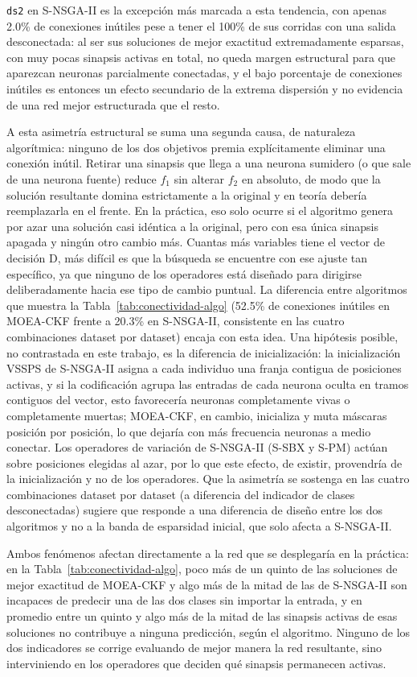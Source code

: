 \texttt{ds2} en S-NSGA-II es la excepción más marcada a esta tendencia, con apenas 2.0\% de conexiones inútiles pese a tener el 100\% de sus corridas con una salida desconectada: al ser sus soluciones de mejor exactitud extremadamente esparsas, con muy pocas sinapsis activas en total, no queda margen estructural para que aparezcan neuronas parcialmente conectadas, y el bajo porcentaje de conexiones inútiles es entonces un efecto secundario de la extrema dispersión y no evidencia de una red mejor estructurada que el resto.

A esta asimetría estructural se suma una segunda causa, de naturaleza algorítmica: ninguno de los dos objetivos premia explícitamente eliminar una conexión inútil. Retirar una sinapsis que llega a una neurona sumidero (o que sale de una neurona fuente) reduce $f_1$ sin alterar $f_2$ en absoluto, de modo que la solución resultante domina estrictamente a la original y en teoría debería reemplazarla en el frente. En la práctica, eso solo ocurre si el algoritmo genera por azar una solución casi idéntica a la original, pero con esa única sinapsis apagada y ningún otro cambio más. Cuantas más variables tiene el vector de decisión D, más difícil es que la búsqueda se encuentre con ese ajuste tan específico, ya que ninguno de los operadores está diseñado para dirigirse deliberadamente hacia ese tipo de cambio puntual. La diferencia entre algoritmos que muestra la Tabla~\ref{tab:conectividad-algo} (52.5\% de conexiones inútiles en MOEA-CKF frente a 20.3\% en S-NSGA-II, consistente en las cuatro combinaciones dataset por dataset) encaja con esta idea. Una hipótesis posible, no contrastada en este trabajo, es la diferencia de inicialización: la inicialización VSSPS de S-NSGA-II asigna a cada individuo una franja contigua de posiciones activas, y si la codificación agrupa las entradas de cada neurona oculta en tramos contiguos del vector, esto favorecería neuronas completamente vivas o completamente muertas; MOEA-CKF, en cambio, inicializa y muta máscaras posición por posición, lo que dejaría con más frecuencia neuronas a medio conectar. Los operadores de variación de S-NSGA-II (S-SBX y S-PM) actúan sobre posiciones elegidas al azar, por lo que este efecto, de existir, provendría de la inicialización y no de los operadores. Que la asimetría se sostenga en las cuatro combinaciones dataset por dataset (a diferencia del indicador de clases desconectadas) sugiere que responde a una diferencia de diseño entre los dos algoritmos y no a la banda de esparsidad inicial, que solo afecta a S-NSGA-II.

Ambos fenómenos afectan directamente a la red que se desplegaría en la práctica: en la Tabla~\ref{tab:conectividad-algo}, poco más de un quinto de las soluciones de mejor exactitud de MOEA-CKF y algo más de la mitad de las de S-NSGA-II son incapaces de predecir una de las dos clases sin importar la entrada, y en promedio entre un quinto y algo más de la mitad de las sinapsis activas de esas soluciones no contribuye a ninguna predicción, según el algoritmo. Ninguno de los dos indicadores se corrige evaluando de mejor manera la red resultante, sino interviniendo en los operadores que deciden qué sinapsis permanecen activas.
